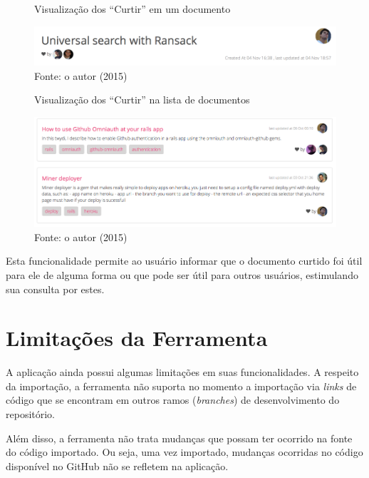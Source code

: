 \begin{figure}[h]
	\centering
    \caption{Visualização dos ``Curtir'' em um documento}
    \includegraphics[width=15cm]{Imagens/print-like-1.png}
	\caption*{Fonte: o autor (2015)}
\end{figure}

\begin{figure}[h]
	\centering
    \caption{Visualização dos ``Curtir'' na lista de documentos}
    \includegraphics[width=15cm]{Imagens/print-like-2.png}
	\caption*{Fonte: o autor (2015)}
\end{figure}

Esta funcionalidade permite ao usuário informar que o documento curtido foi útil para ele de alguma forma ou que pode ser útil para outros usuários, estimulando sua consulta por estes.

\section{Limitações da Ferramenta}

A aplicação ainda possui algumas limitações em suas funcionalidades. A respeito da importação, a ferramenta não suporta no momento a importação via \textit{links} de código que se encontram em outros ramos (\textit{branches}) de desenvolvimento do repositório.

Além disso, a ferramenta não trata mudanças que possam ter ocorrido na fonte do código importado. Ou seja, uma vez importado, mudanças ocorridas no código disponível no GitHub não se refletem na aplicação.

